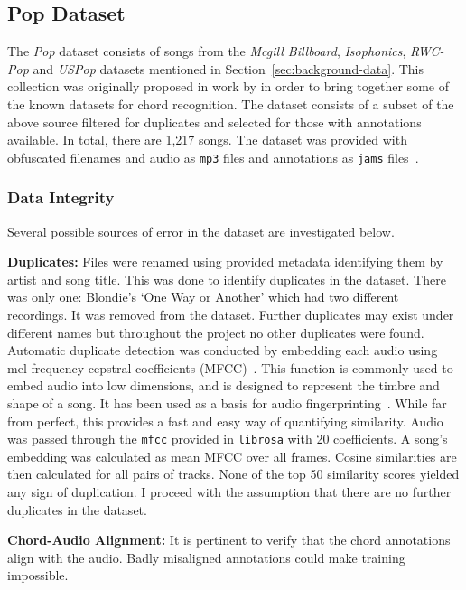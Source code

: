 \subsection{Pop Dataset}

The \emph{Pop} dataset consists of songs from the \emph{Mcgill Billboard}, \emph{Isophonics}, \emph{RWC-Pop} and \emph{USPop} datasets mentioned in Section~\ref{sec:background-data}. This collection was originally proposed in work by \citet{FourTimelyInsights} in order to bring together some of the known datasets for chord recognition. The dataset consists of a subset of the above source filtered for duplicates and selected for those with annotations available. In total, there are 1,217 songs. The dataset was provided with obfuscated filenames and audio as \texttt{mp3} files and annotations as \texttt{jams} files~\citep{JAMS}. 

\subsubsection{Data Integrity}\label{sec:data-integrity}

Several possible sources of error in the dataset are investigated below.

\textbf{Duplicates:} Files were renamed using provided metadata identifying them by artist and song title. This was done to identify duplicates in the dataset. There was only one: Blondie's `One Way or Another' which had two different recordings. It was removed from the dataset. Further duplicates may exist under different names but throughout the project no other duplicates were found. Automatic duplicate detection was conducted by embedding each audio using mel-frequency cepstral coefficients (MFCC)~\citep{MFCC}. This function is commonly used to embed audio into low dimensions, and is designed to represent the timbre and shape of a song. It has been used as a basis for audio fingerprinting~\citep{MFCCfingerprinting}. While far from perfect, this provides a fast and easy way of quantifying similarity. Audio was passed through the \texttt{mfcc} provided in \texttt{librosa} with 20 coefficients. A song's embedding was calculated as mean MFCC over all frames. Cosine similarities are then calculated for all pairs of tracks. None of the top 50 similarity scores yielded any sign of duplication. I proceed with the assumption that there are no further duplicates in the dataset.

\textbf{Chord-Audio Alignment:} It is pertinent to verify that the chord annotations align with the audio. Badly misaligned annotations could make training impossible.


